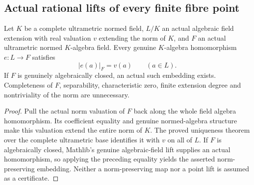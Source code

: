 \subsection{Actual rational lifts of every finite fibre point}
\label{subsec:rational-fibre-lifts}

\begin{theorem}
\label{field:complete-ultrametric-algebraic-embedding}
\leanok
{}
Let $K$ be a complete ultrametric normed field, $L/K$ an actual algebraic
field extension with real valuation $v$ extending the norm of $K$, and
$F$ an actual ultrametric normed $K$-algebra field. Every genuine
$K$-algebra homomorphism $e:L\to F$ satisfies
\[
 |e(a)|_F=v(a)\qquad(a\in L).
\]
If $F$ is genuinely algebraically closed, an actual such embedding exists.
Completeness of $F$, separability, characteristic zero, finite extension
degree and nontriviality of the norm are unnecessary.
\end{theorem}
\begin{proof}
Pull the actual norm valuation of $F$ back along the whole field algebra
homomorphism. Its coefficient equality and genuine normed-algebra
structure make this valuation extend the entire norm of $K$. The proved
uniqueness theorem over the complete ultrametric base identifies it with
$v$ on all of $L$. If $F$ is algebraically closed, Mathlib's genuine
algebraic-field lift supplies an actual homomorphism, so applying the
preceding equality yields the asserted norm-preserving embedding. Neither
a norm-preserving map nor a point lift is assumed as a certificate.
\end{proof}

